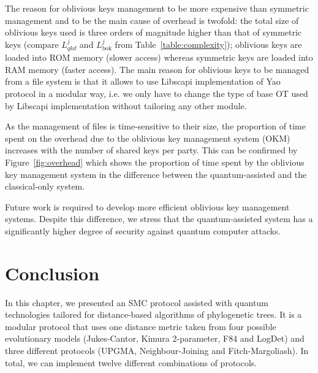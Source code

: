 The reason for oblivious keys management to be more expensive than symmetric management and to be the main cause of overhead is twofold: the total size of oblivious keys used is three orders of magnitude higher than that of symmetric keys (compare $L^j_{qkd}$ and $L^j_{\text{bok}}$ from Table~\ref{table:complexity}); oblivious keys are loaded into ROM memory (slower access) whereas symmetric keys are loaded into RAM memory (faster access). The main reason for oblivious keys to be managed from a file system is that it allows to use Libscapi implementation of Yao protocol in a modular way, i.e. we only have to change the type of base OT used by Libscapi implementation without tailoring any other module.

As the management of files is time-sensitive to their size, the proportion of time spent on the overhead due to the oblivious key management system (OKM) increases with the number of shared keys per party. This can be confirmed by Figure~\ref{fig:overhead} which shows the proportion of time spent by the oblivious key management system in the difference between the quantum-assisted and the classical-only system.

Future work is required to develop more efficient oblivious key management systems. Despite this difference, we stress that the quantum-assisted system has a significantly higher degree of security against quantum computer attacks.




\section{Conclusion}

In this chapter, we presented an SMC protocol assisted with quantum technologies tailored for distance-based algorithms of phylogenetic trees. It is a modular protocol that uses one distance metric taken from four possible evolutionary models (Jukes-Cantor, Kimura 2-parameter, F84 and LogDet) and three different protocols (UPGMA, Neighbour-Joining and Fitch-Margoliash). In total, we can implement twelve different combinations of protocols.

